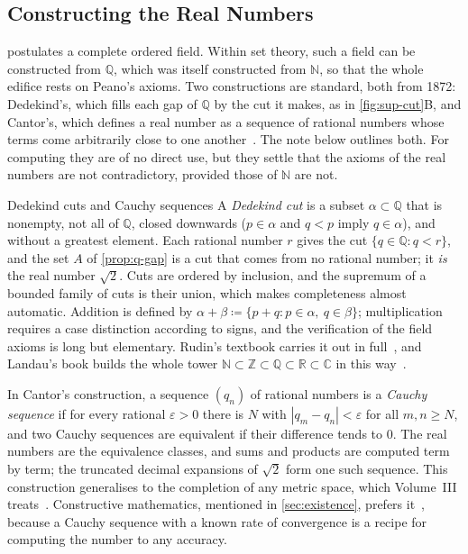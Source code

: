 \subsection{Constructing the Real Numbers}

 postulates a complete ordered field. Within set theory, such a field can be constructed from $\mathbb Q$, which was itself constructed from $\mathbb N$, so that the whole edifice rests on Peano's axioms. Two constructions are standard, both from 1872: Dedekind's, which fills each gap of $\mathbb Q$ by the cut it makes, as in \cref{fig:sup-cut}B, and Cantor's, which defines a real number as a sequence of rational numbers whose terms come arbitrarily close to one another~\cite{dedekind1872,ebbinghaus1991}. The note below outlines both. For computing they are of no direct use, but they settle that the axioms of the real numbers are not contradictory, provided those of $\mathbb N$ are not.

\begin{note}{Dedekind cuts and Cauchy sequences}
A \emph{Dedekind cut} is a subset $\alpha\subset\mathbb Q$ that is nonempty, not all of $\mathbb Q$, closed downwards ($p\in\alpha$ and $q<p$ imply $q\in\alpha$), and without a greatest element. Each rational number $r$ gives the cut $\{q\in\mathbb Q: q<r\}$, and the set $A$ of \cref{prop:q-gap} is a cut that comes from no rational number; it \emph{is} the real number $\sqrt2$. Cuts are ordered by inclusion, and the supremum of a bounded family of cuts is their union, which makes completeness almost automatic. Addition is defined by $\alpha+\beta\coloneqq\{p+q: p\in\alpha,\ q\in\beta\}$; multiplication requires a case distinction according to signs, and the verification of the field axioms is long but elementary. Rudin's textbook carries it out in full~\cite{rudin1976}, and Landau's book builds the whole tower $\mathbb N\subset\mathbb Z\subset\mathbb Q\subset\mathbb R\subset\mathbb C$ in this way~\cite{landau1930}.

In Cantor's construction, a sequence $(q_n)$ of rational numbers is a \emph{Cauchy sequence} if for every rational $\varepsilon>0$ there is $N$ with $|q_m-q_n|<\varepsilon$ for all $m,n\ge N$, and two Cauchy sequences are equivalent if their difference tends to $0$. The real numbers are the equivalence classes, and sums and products are computed term by term; the truncated decimal expansions of $\sqrt2$ form one such sequence. This construction generalises to the completion of any metric space, which Volume~III treats~\cite{ebbinghaus1991}. Constructive mathematics, mentioned in \cref{sec:existence}, prefers it~\cite{bishop1967}, because a Cauchy sequence with a known rate of convergence is a recipe for computing the number to any accuracy.
\end{note}

